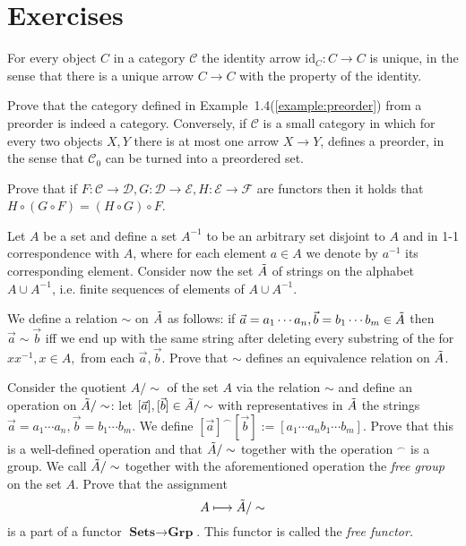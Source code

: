\documentclass[11pt]{article}
\theoremstyle{plain}
\theoremstyle{definition}
\theoremstyle{remark}
\newcommand{\cC}{\mathcal{C}}
\newcommand{\cD}{\mathcal{D}}
\newcommand{\cE}{\mathcal{E}}
\newcommand{\cF}{\mathcal{F}}
\newcommand{\id}{\mathrm{id}}
\begin{document}
\section{Exercises}


\begin{exercise}\label{exc:identity}
 For every object $C$ in a category $\cC$ the identity arrow $\id_{C}:C\to C$
is unique, in the sense that there is a unique arrow $C\to C$ with the 
property of the identity.
\end{exercise}

\begin{exercise}\label{exc:preorder}
Prove that the category defined in Example~1.4(\ref{example:preorder}) from a preorder
is indeed a
category. Conversely, if $\cC$ is a small category in which for every two objects
$X,Y$ there is at most one arrow $X\to Y$, defines a preorder, in the sense that $\cC_{0}$
can be turned into a preordered set.
\end{exercise}

\begin{exercise}\label{exc:assoc.func}
Prove that if $F:\cC\to\cD, G:\cD\to\cE, H:\cE\to\cF$ are functors then it holds that
$H\circ(G\circ F)=(H\circ G)\circ F$.
\end{exercise}

\begin{exercise}\label{exc:freefunctor}
Let $A$ be a set and define a set $A^{-1}$ to be an arbitrary set 
disjoint to $A$ and in 1-1 correspondence with $A$, where for each element
$a\in A$ we denote by $a^{-1}$ its corresponding element. Consider now the set
$\Tilde{A}$ of strings on the alphabet $A\cup A^{-1}$, i.e. finite sequences of
elements of $A\cup A^{-1}$.

We define a relation $\sim$ on $\Tilde{A}$ as follows: if $\vec{a}=a_{1}\cdots a_{n},
\vec{b}=b_{1}\cdots b_{m}\in\Tilde{A}$ then $\vec{a}\sim\vec{b}$ iff
we end up with the same string after deleting every substring of the
for $xx^{-1}, x\in A,$ from each $\vec{a},\vec{b}$.
Prove that $\sim$ defines an equivalence relation on $\Tilde{A}$.

Consider the quotient $A/\sim$ of the set $A$ via the relation $\sim$ and
define an operation on $\Tilde{A}/\sim$: let
$[\vec{a}],[\vec{b}]\in\Tilde{A}/\sim$
with representatives in $\Tilde{A}$ the strings $\vec{a}=a_{1}\cdots a_{n},
\vec{b}=b_{1}\cdots b_{m}$.
We define $[\vec{a}]^{\frown}[\vec{b}]:=[a_{1}\cdots a_{n}b_{1}\cdots b_{m}]$.
Prove that this is a well-defined operation and that $\Tilde{A}/\sim$ together
with the operation $^\frown$ is a group. We call $\Tilde{A}/\sim$ 
together with the aforementioned operation the
{\em free group} on the set $A$. Prove that the assignment
\begin{equation*}
    A\longmapsto \Tilde{A}/\sim
\end{equation*}
is a part of a functor $\textbf{Sets}\to\textbf{Grp}$. This functor is called the
{\em free functor.}
\end{exercise}
\end{document}
